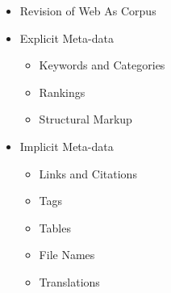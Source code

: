 \documentclass[a4paper,landscape,headrule,footrule,xetex]{foils}
\begin{document}


\maketitle


\begin{itemize}
\item Revision of Web As Corpus
\item Explicit Meta-data
  \begin{itemize}
  \item Keywords and Categories
  \item Rankings
  \item Structural Markup
  \end{itemize}
\item Implicit Meta-data
  \begin{itemize}
  \item Links and Citations
  \item Tags
  \item Tables
  \item File Names
  \item Translations
  \end{itemize}
\end{itemize}



\end{document}
